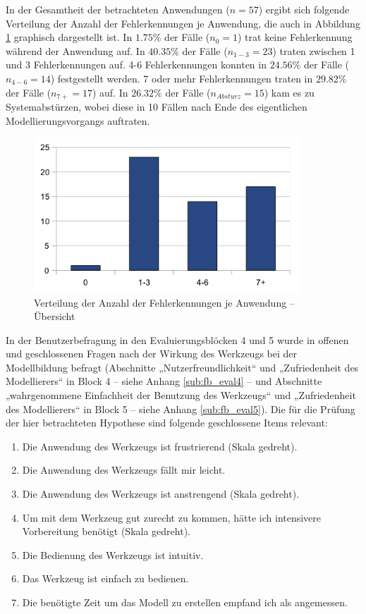 In der Gesamtheit der betrachteten Anwendungen ($n=57$) ergibt sich folgende Verteilung der Anzahl der Fehlerkennungen je Anwendung, die auch in Abbildung \ref{fig:img_Evaluierung_fehlerkennungen} graphisch dargestellt ist. In $1.75\%$ der Fälle ($n_{0}=1$) trat keine Fehlerkennung während der Anwendung auf. In $40.35\%$ der Fälle ($n_{1-3}=23$) traten zwischen 1 und 3 Fehlerkennungen auf. 4-6 Fehlerkennungen konnten in $24.56\%$ der Fälle ($n_{4-6}=14$) festgestellt werden. 7 oder mehr Fehlerkennungen traten in $29.82\%$ der Fälle ($n_{7+}=17$) auf. In $26.32\%$ der Fälle ($n_{Absturz}=15$) kam es zu Systemabstürzen, wobei diese in 10 Fällen nach Ende des eigentlichen Modellierungsvorgangs auftraten.

\begin{figure}[htbp]
	\centering
		\includegraphics[width=10cm]{img/Evaluierung/fehlerkennungen.png}
	\caption{Verteilung der Anzahl der Fehlerkennungen je Anwendung -- Übersicht}
	\label{fig:img_Evaluierung_fehlerkennungen}
\end{figure}

In der Benutzerbefragung in den Evaluierungsblöcken 4 und 5 wurde in offenen und geschlossenen Fragen nach der Wirkung des Werkzeugs bei der Modellbildung befragt (Abschnitte „Nutzerfreundlichkeit“ und „Zufriedenheit des Modellierers“ in Block 4 -- siehe Anhang \ref{sub:fb_eval4} -- und Abschnitte „wahrgenommene Einfachheit der Benutzung des Werkzeugs“ und „Zufriedenheit des Modellierers“ in Block 5 -- siehe Anhang \ref{sub:fb_eval5}). Die für die Prüfung der hier betrachteten Hypothese sind folgende geschlossene Items relevant:

\begin{enumerate}
	\item Die Anwendung des Werkzeugs ist frustrierend (Skala gedreht).
	\item Die Anwendung des Werkzeugs fällt mir leicht.
	\item Die Anwendung des Werkzeugs ist anstrengend (Skala gedreht).
	\item Um mit dem Werkzeug gut zurecht zu kommen, hätte ich intensivere Vorbereitung benötigt (Skala gedreht).
	\item Die Bedienung des Werkzeugs ist intuitiv.
	\item Das Werkzeug ist einfach zu bedienen.
	\item Die benötigte Zeit um das Modell zu erstellen empfand ich als angemessen.
\end{enumerate}

